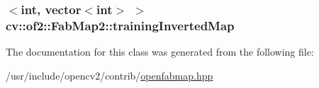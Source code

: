 \hypertarget{classcv_1_1of2_1_1FabMap2_a4c1f0ec8cd750efb89dfc6209ce4d69f}{
\subsubsection[{training\-Inverted\-Map}]{$<$int, vector$<$int$>$ $>$ cv\-::of2\-::\-Fab\-Map2\-::training\-Inverted\-Map\hspace{0.3cm}{\ttfamily [protected]}}}\label{classcv_1_1of2_1_1FabMap2_a4c1f0ec8cd750efb89dfc6209ce4d69f}


The documentation for this class was generated from the following file\-:\begin{DoxyCompactItemize}
\item 
/usr/include/opencv2/contrib/\hyperlink{openfabmap_8hpp}{openfabmap.\-hpp}\end{DoxyCompactItemize}

